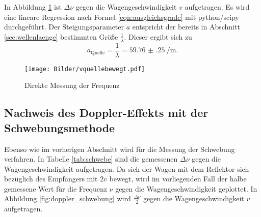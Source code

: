 In Abbildung \ref{fig:doppler} ist $\Delta \nu$ gegen die Wagengeschwindigkeit $v$ aufgetragen.
Es wird eine lineare Regression nach Formel \eqref{eqn:ausgleichsgrade} mit python/scipy \cite{scipy} durchgeführt.
Der Steigungsparameter $a$ entspricht der bereits in Abschnitt \ref{sec:wellenlaenge} bestimmten Größe $\frac{1}{\lambda}$.
Dieser ergibt sich zu
\begin{equation*}
	a_{\mathrm{Quelle}}=\frac{1}{\lambda}=\SI{59.76(25)}{\per\meter} \text{.}
\end{equation*}
\begin{figure}
	\texttt{[image: Bilder/vquellebewegt.pdf]}
	\caption{Direkte Messung der Frequenz}
	\label{fig:doppler}
\end{figure}
\FloatBarrier
\subsection{Nachweis des Doppler-Effekts mit der Schwebungsmethode}
Ebenso wie im vorherigen Abschnitt wird für die Messung der Schwebung verfahren. In Tabelle \ref{tab:schwebe} sind die gemessenen $\Delta \nu$ gegen die Wagengeschwindigkeit aufgetragen.
Da sich der Wagen mit dem Reflektor sich bezüglich des Empfängers mit $2v$ bewegt, wird im vorliegenden Fall der halbe gemessene Wert für die Frequenz $\nu$ gegen die Wagengeschwindigkeit geplottet.
In Abbildung \ref{fig:doppler_schwebung} wird $\frac{\Delta \nu}{2}$ gegen die Wagengeschwindigkeit $v$ aufgetragen.
